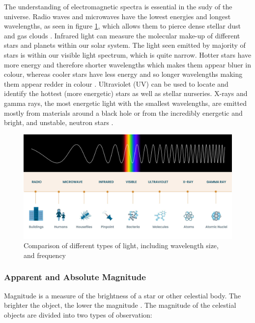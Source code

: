 \documentclass[12pt]{article}
\begin{document}
The understanding of electromagnetic spectra is essential in the sudy of the universe. Radio waves and microwaves have the lowest energies and longest wavelengths, as seen in
figure \ref{fig:wavelength}, which allows them to pierce dense stellar dust and gas clouds
\cite{hubblespectra}.
Infrared light can measure the molecular make-up of different stars and planets within our solar system.
The light seen emitted by majority of stars is within our visible light spectrum, which is quite narrow. Hotter stars have more energy and therefore shorter wavelengths
which makes them appear bluer in colour, whereas cooler stars have less energy and so longer wavelengths making them appear redder in colour
\cite{hubblespectra}.
Ultraviolet (UV) can be used to locate and identify the hottest (more energetic) stars as well as stellar nurseries.
X-rays and gamma rays, the most energetic light with the smallest wavelengths, are emitted mostly from materials around a black hole or from
the incredibly energetic and bright, and unstable, neutron stars
\cite{hubblespectra}.

\begin{figure}[H]
    \centering
    \includegraphics[width=15cm]{light waves.jpg}
    \caption{\centering \footnotesize{Comparison of different types of light, including wavelength size, and frequency \protect\cite{hubblespectra}}}
    \label{fig:wavelength}
\end{figure}

\subsubsection{Apparent and Absolute Magnitude} \label{sec:1.2.1}

Magnitude is a measure of the brightness of a star or other celestial body. The brighter the object, the lower the magnitude
\cite{britmag}.
The magnitude of the celestial objects are divided into two types of observation:
\end{document}
